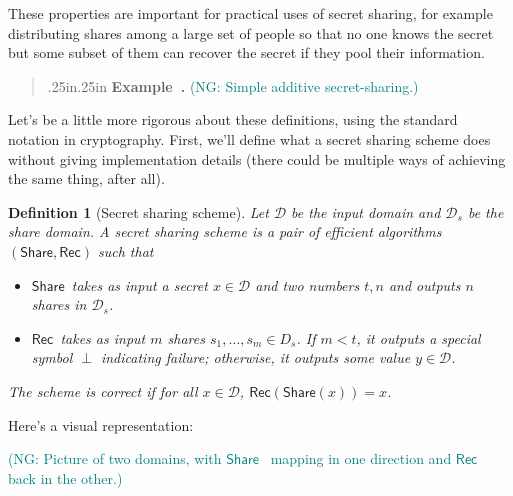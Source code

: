 \documentclass[12 pt]{article}
\newtheorem{definition}{Definition}
\def\D{\ensuremath{\mathcal{D}}}
\def\bin{\ensuremath{\{0, 1\}}}
\newcommand{\nsm}[1]{\textcolor{teal}{(NG: #1)}}
\newcounter{exercise}[section]
\newcounter{example}[section]
\newenvironment{example}{\refstepcounter{example}\par\bigskip \begin{quotation}{}{\leftmargin .25in\rightmargin .25in}
    \noindent \textbf{Example~\thesection.\theexercise }  \rmfamily}{\end{quotation}\par\bigskip}
\begin{document}
These properties are important for practical uses of secret sharing, for 
example distributing shares among a large set of people so that no one 
knows the secret but some subset of them can recover the secret if they 
pool their information.

\begin{example}
    \nsm{Simple additive secret-sharing.}
\end{example}

Let's be a little more rigorous about these definitions, using the standard
notation in cryptography. First, we'll define what a secret sharing scheme 
does without giving implementation details (there could be multiple ways 
of achieving the same thing, after all).

\def\share{\ensuremath{\mathsf{Share}}}
\def\rec{\ensuremath{\mathsf{Rec}}}
\begin{definition}[Secret sharing scheme]
    Let $\D$ be the input domain and $\D_s$ be the share domain.
    A secret sharing scheme is a pair of efficient algorithms $(\share, \rec)$
    such that

    \begin{itemize}
        \item \share~takes as input a secret $x \in \D$ and two numbers $t, n$ 
        and outputs $n$ shares in $\D_s$.
        \item \rec~takes as input $m$ shares $s_1, \ldots, s_m \in D_s$. 
        If $m < t$, it outputs a special symbol $\perp$ indicating failure; 
        otherwise, it outputs some value $y \in \D$.
    \end{itemize}

    The scheme is \emph{correct} if for all $x \in \D$, $\rec(\share(x)) = x$.
\end{definition}

Here's a visual representation:

\nsm{Picture of two domains, with \share~ mapping in one direction and 
\rec~ back in the other.}

\end{document}
